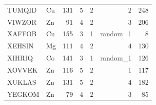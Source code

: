 \begin{table}[h]
\begin{tabular}{llrrrrr}
TUMQID & Cu & 131 & 5 & 2 & 2 & 248 \\
VIWZOR & Zn & 91 & 4 & 2 & 3 & 206 \\
XAFFOB & Cu & 155 & 3 & 1 & random\_1 & 8 \\
XEHSIN & Mg & 111 & 4 & 2 & 4 & 130 \\
XIHRIQ & Co & 141 & 3 & 1 & random\_1 & 126 \\
XOVVEK & Zn & 116 & 5 & 2 & 1 & 117 \\
XUKLAS & Zn & 131 & 5 & 2 & 4 & 182 \\
YEGKOM & Zn & 79 & 4 & 2 & 3 & 85 \\
\bottomrule
\end{tabular}
\end{table}

\FloatBarrier

\clearpage
